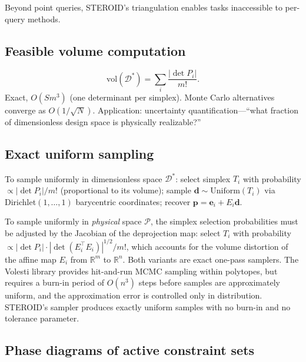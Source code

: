 \documentclass[review,onefignum,onetabnum]{./SIAM_template/siamart171218}
\begin{document}
Beyond point queries, STEROID's triangulation enables tasks inaccessible to per-query
methods.

\subsection{Feasible volume computation}

\begin{equation}
	\mathrm{vol}(\mathcal{D}^*) = \sum_i \frac{|\det P_i|}{m!}.
\end{equation}
Exact, $O(S m^3)$ (one determinant per simplex).  Monte Carlo alternatives converge as $O(1/\sqrt{N})$.
Application: uncertainty quantification---``what fraction of dimensionless design
space is physically realizable?''

\subsection{Exact uniform sampling}

To sample uniformly in dimensionless space $\mathcal{D}^*$: select simplex $T_i$
with probability $\propto |\det P_i|/m!$ (proportional to its volume); sample
$\mathbf{d} \sim \mathrm{Uniform}(T_i)$ via Dirichlet$(1,\ldots,1)$ barycentric
coordinates; recover $\mathbf{p} = \mathbf{e}_i + E_i \mathbf{d}$.

To sample uniformly in \emph{physical} space $\mathcal{P}$, the simplex selection
probabilities must be adjusted by the Jacobian of the deprojection map: select $T_i$
with probability $\propto |\det P_i| \cdot |\det(E_i^\top E_i)|^{1/2} / m!$, which
accounts for the volume distortion of the affine map $E_i$ from $\mathbb{R}^m$ to
$\mathbb{R}^n$.  Both variants are exact one-pass samplers.  The Volesti
library \cite{volesti} provides hit-and-run MCMC sampling within polytopes,
but requires a burn-in period of $O(n^3)$ steps before samples are
approximately uniform, and the approximation error is controlled only in
distribution.  STEROID's sampler produces exactly uniform samples with no
burn-in and no tolerance parameter.

\subsection{Phase diagrams of active constraint sets}
\end{document}
